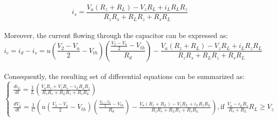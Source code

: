 \begin{equation}
    i_s=\frac{V_a(R_z+R_L)-V_zR_L+i_LR_LR_z}{R_zR_s+R_LR_z+R_sR_L}
\end{equation}\\

Moreover, the current flowing through the capacitor can be expressed as:\\

\begin{equation}
    i_c=i_d-i_s=u(\frac{V_2-V_a}{2}-V_{th})(\frac{\frac{V_2-V_a}{2}-V_{th}}{R_d})-\frac{V_a(R_z+R_L)-V_zR_L+i_LR_zR_L}{R_zR_s+R_LR_z+R_sR_L}
\end{equation}\\

Consequently, the resulting set of differential equations can be summarized as:\\

\begin{equation}
    \begin{cases}
        \frac{di_L}{dt}=\frac{1}{L}(\frac{V_aR_z+V_zR_s-i_LR_sR_z}{R_zR_s+R_LR_z+R_sR_L})\\
        \frac{dV_a}{dt}=\frac{1}{C}(u(\frac{V_2-V_a}{2}-V_{th})(\frac{\frac{V_2-V_a}{2}-V_{th}}{R_d})-\frac{V_a(R_z+R_L)-V_zR_L+i_LR_zR_L}{R_zR_s+R_LR_z+R_sR_L}),  \text{if } \frac{V_a-i_LR_s}{R_s+R_L}R_L \geq V_z
    \end{cases}
\end{equation}\\




